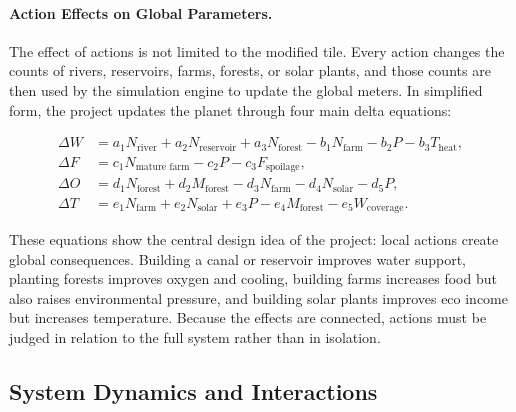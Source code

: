\documentclass[12pt,a4paper]{article}
\begin{document}
\paragraph{Action Effects on Global Parameters.}
The effect of actions is not limited to the modified tile. Every action changes the counts of rivers, reservoirs, farms, forests, or solar plants, and those counts are then used by the simulation engine to update the global meters. In simplified form, the project updates the planet through four main delta equations:

\begin{align}
\Delta W &= a_1N_{\text{river}} + a_2N_{\text{reservoir}} + a_3N_{\text{forest}} - b_1N_{\text{farm}} - b_2P - b_3T_{\text{heat}}, \\
\Delta F &= c_1N_{\text{mature farm}} - c_2P - c_3F_{\text{spoilage}}, \\
\Delta O &= d_1N_{\text{forest}} + d_2M_{\text{forest}} - d_3N_{\text{farm}} - d_4N_{\text{solar}} - d_5P, \\
\Delta T &= e_1N_{\text{farm}} + e_2N_{\text{solar}} + e_3P - e_4M_{\text{forest}} - e_5W_{\text{coverage}}.
\end{align}

These equations show the central design idea of the project: local actions create global consequences. Building a canal or reservoir improves water support, planting forests improves oxygen and cooling, building farms increases food but also raises environmental pressure, and building solar plants improves eco income but increases temperature. Because the effects are connected, actions must be judged in relation to the full system rather than in isolation.

\subsection{System Dynamics and Interactions}
\end{document}
